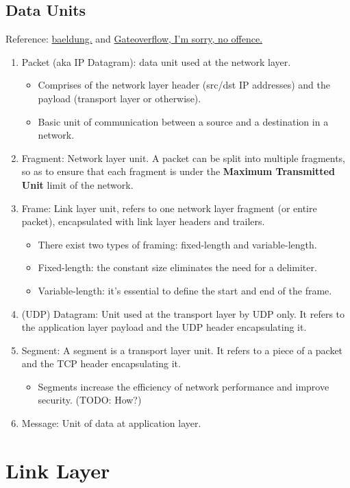 \documentclass{report}
\begin{document}
\section{Data Units}
Reference: \href{https://www.baeldung.com/cs/networking-packet-fragment-frame-datagram-segment}{baeldung.} and \href{https://gateoverflow.in/139334/name-of-data-unit-at-different-layers}{Gateoverflow, I'm sorry, no offence.}
\begin{enumerate}
\item Packet (aka IP Datagram): data unit used at the network layer.
\begin{itemize}
    \item Comprises of the network layer header (src/dst IP addresses) and the payload (transport layer or otherwise).
    \item Basic unit of communication between a source and a destination in a network.
\end{itemize}
\item Fragment: Network layer unit. A packet can be split into multiple fragments, so as to ensure that each fragment is under the \textbf{Maximum Transmitted Unit} limit of the network.
\item Frame: Link layer unit, refers to one network layer fragment (or entire packet), encapsulated with link layer headers and trailers.
\begin{itemize}
    \item There exist two types of framing: fixed-length and variable-length.
    \item Fixed-length: the constant size eliminates the need for a delimiter.
    \item Variable-length: it's essential to define the start and end of the frame.
\end{itemize}
\item (UDP) Datagram: Unit used at the transport layer by UDP only. It refers to the application layer payload and the UDP header encapsulating it.
\item Segment: A segment is a transport layer unit. It refers to a piece of a packet and the TCP header encapsulating it.
\begin{itemize}
\item Segments increase the efficiency of network performance and improve security. (TODO: How?)
\end{itemize}
\item Message: Unit of data at application layer.
\end{enumerate}
\chapter{Link Layer}
\end{document}

